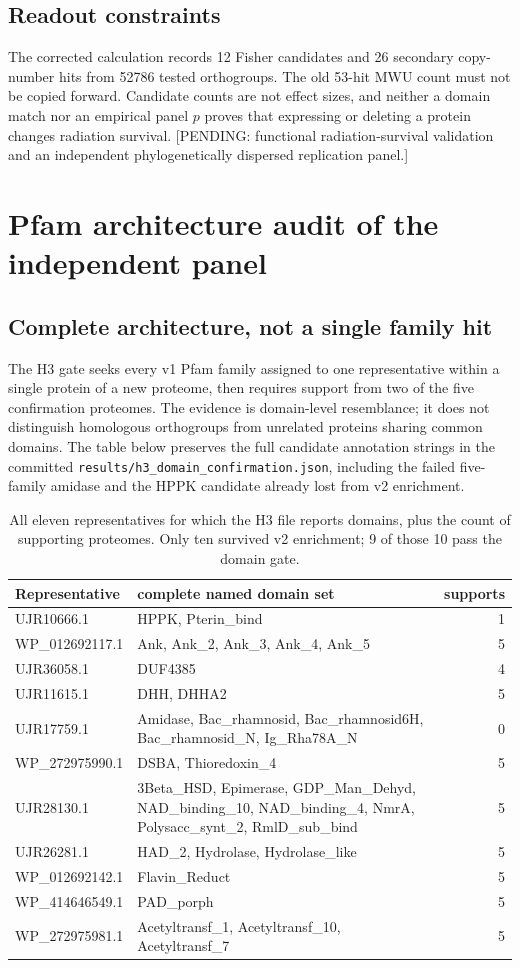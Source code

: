 \subsection{Readout constraints}
The corrected calculation records 12 Fisher candidates and 26 secondary copy-number hits from 52786 tested orthogroups. The old 53-hit MWU count must not be copied forward. Candidate counts are not effect sizes, and neither a domain match nor an empirical panel $p$ proves that expressing or deleting a protein changes radiation survival. [PENDING: functional radiation-survival validation and an independent phylogenetically dispersed replication panel.]

\section{Pfam architecture audit of the independent panel}
\subsection{Complete architecture, not a single family hit}
The H3 gate seeks every v1 Pfam family assigned to one representative within a single protein of a new proteome, then requires support from two of the five confirmation proteomes. The evidence is domain-level resemblance; it does not distinguish homologous orthogroups from unrelated proteins sharing common domains. The table below preserves the full candidate annotation strings in the committed \texttt{results/h3\_domain\_confirmation.json}, including the failed five-family amidase and the HPPK candidate already lost from v2 enrichment.
\begin{table}[!htbp]\centering\scriptsize\caption{All eleven representatives for which the H3 file reports domains, plus the count of supporting proteomes. Only ten survived v2 enrichment; 9 of those 10 pass the domain gate.}\begin{tabular}{p{2.2cm}p{7.3cm}r}\hline Representative & complete named domain set & supports \\\hline
UJR10666.1 & HPPK, Pterin\_bind & 1 \\
WP\_012692117.1 & Ank, Ank\_2, Ank\_3, Ank\_4, Ank\_5 & 5 \\
UJR36058.1 & DUF4385 & 4 \\
UJR11615.1 & DHH, DHHA2 & 5 \\
UJR17759.1 & Amidase, Bac\_rhamnosid, Bac\_rhamnosid6H, Bac\_rhamnosid\_N, Ig\_Rha78A\_N & 0 \\
WP\_272975990.1 & DSBA, Thioredoxin\_4 & 5 \\
UJR28130.1 & 3Beta\_HSD, Epimerase, GDP\_Man\_Dehyd, NAD\_binding\_10, NAD\_binding\_4, NmrA, Polysacc\_synt\_2, RmlD\_sub\_bind & 5 \\
UJR26281.1 & HAD\_2, Hydrolase, Hydrolase\_like & 5 \\
WP\_012692142.1 & Flavin\_Reduct & 5 \\
WP\_414646549.1 & PAD\_porph & 5 \\
WP\_272975981.1 & Acetyltransf\_1, Acetyltransf\_10, Acetyltransf\_7 & 5 \\
\hline\end{tabular}\end{table}

